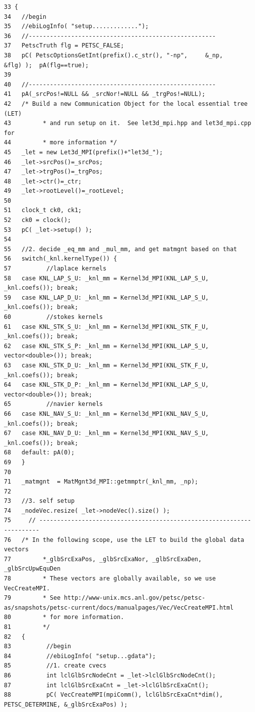 \footnotesize\begin{verbatim}33 {
34   //begin
35   //ebiLogInfo( "setup............."); 
36   //-----------------------------------------------------
37   PetscTruth flg = PETSC_FALSE;
38   pC( PetscOptionsGetInt(prefix().c_str(), "-np",     &_np,     &flg) );  pA(flg==true);
39   
40   //-----------------------------------------------------
41   pA(_srcPos!=NULL && _srcNor!=NULL && _trgPos!=NULL);
42   /* Build a new Communication Object for the local essential tree (LET)
43         * and run setup on it.  See let3d_mpi.hpp and let3d_mpi.cpp for
44         * more information */
45   _let = new Let3d_MPI(prefix()+"let3d_");
46   _let->srcPos()=_srcPos;
47   _let->trgPos()=_trgPos;
48   _let->ctr()=_ctr;
49   _let->rootLevel()=_rootLevel; 
50 
51   clock_t ck0, ck1;
52   ck0 = clock();
53   pC( _let->setup() );  
54   
55   //2. decide _eq_mm and _mul_mm, and get matmgnt based on that
56   switch(_knl.kernelType()) {
57          //laplace kernels
58   case KNL_LAP_S_U: _knl_mm = Kernel3d_MPI(KNL_LAP_S_U, _knl.coefs()); break;
59   case KNL_LAP_D_U: _knl_mm = Kernel3d_MPI(KNL_LAP_S_U, _knl.coefs()); break;
60          //stokes kernels
61   case KNL_STK_S_U: _knl_mm = Kernel3d_MPI(KNL_STK_F_U, _knl.coefs()); break;
62   case KNL_STK_S_P: _knl_mm = Kernel3d_MPI(KNL_LAP_S_U, vector<double>()); break;
63   case KNL_STK_D_U: _knl_mm = Kernel3d_MPI(KNL_STK_F_U, _knl.coefs()); break;
64   case KNL_STK_D_P: _knl_mm = Kernel3d_MPI(KNL_LAP_S_U, vector<double>()); break;
65          //navier kernels
66   case KNL_NAV_S_U: _knl_mm = Kernel3d_MPI(KNL_NAV_S_U, _knl.coefs()); break;
67   case KNL_NAV_D_U: _knl_mm = Kernel3d_MPI(KNL_NAV_S_U, _knl.coefs()); break;
68   default: pA(0);
69   }
70   
71   _matmgnt  = MatMgnt3d_MPI::getmmptr(_knl_mm, _np);
72 
73   //3. self setup
74   _nodeVec.resize( _let->nodeVec().size() );
75     // ----------------------------------------------------------------------
76   /* In the following scope, use the LET to build the global data vectors
77         *_glbSrcExaPos, _glbSrcExaNor, _glbSrcExaDen, _glbSrcUpwEquDen
78         * These vectors are globally available, so we use VecCreateMPI.
79         * See http://www-unix.mcs.anl.gov/petsc/petsc-as/snapshots/petsc-current/docs/manualpages/Vec/VecCreateMPI.html
80         * for more information.
81         */
82   {
83          //begin
84          //ebiLogInfo( "setup...gdata");
85          //1. create cvecs
86          int lclGlbSrcNodeCnt = _let->lclGlbSrcNodeCnt();
87          int lclGlbSrcExaCnt = _let->lclGlbSrcExaCnt();
88          pC( VecCreateMPI(mpiComm(), lclGlbSrcExaCnt*dim(),         PETSC_DETERMINE, &_glbSrcExaPos) );

\end{verbatim}
